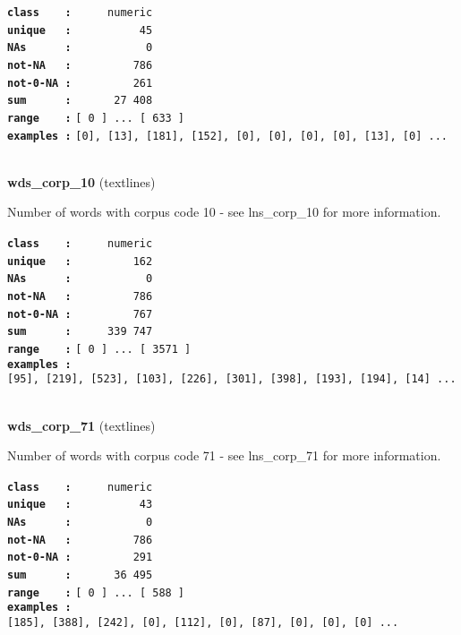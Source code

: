\documentclass[]{article}
\begin{document}
\textbf{\texttt{class\ \ \ \ :}} \texttt{~~~~~numeric}\\
\textbf{\texttt{unique\ \ \ :}} \texttt{~~~~~~~~~~45}\\
\textbf{\texttt{NAs\ \ \ \ \ \ :}} \texttt{~~~~~~~~~~~0}\\
\textbf{\texttt{not-NA\ \ \ :}} \texttt{~~~~~~~~~786}\\
\textbf{\texttt{not-0-NA\ :}} \texttt{~~~~~~~~~261}\\
\textbf{\texttt{sum\ \ \ \ \ \ :}} \texttt{~~~~~~27~408}\\
\textbf{\texttt{range\ \ \ \ :}}
\texttt{{[}\ 0\ {]}\ ...\ {[}\ 633\ {]}}\\
\textbf{\texttt{examples\ :}}
\texttt{{[}0{]},\ {[}13{]},\ {[}181{]},\ {[}152{]},\ {[}0{]},\ {[}0{]},\ {[}0{]},\ {[}0{]},\ {[}13{]},\ {[}0{]}\ ...}\\

~

\textbf{wds\_corp\_10} (textlines)

Number of words with corpus code 10 - see lns\_corp\_10 for more
information.

\textbf{\texttt{class\ \ \ \ :}} \texttt{~~~~~numeric}\\
\textbf{\texttt{unique\ \ \ :}} \texttt{~~~~~~~~~162}\\
\textbf{\texttt{NAs\ \ \ \ \ \ :}} \texttt{~~~~~~~~~~~0}\\
\textbf{\texttt{not-NA\ \ \ :}} \texttt{~~~~~~~~~786}\\
\textbf{\texttt{not-0-NA\ :}} \texttt{~~~~~~~~~767}\\
\textbf{\texttt{sum\ \ \ \ \ \ :}} \texttt{~~~~~339~747}\\
\textbf{\texttt{range\ \ \ \ :}}
\texttt{{[}\ 0\ {]}\ ...\ {[}\ 3571\ {]}}\\
\textbf{\texttt{examples\ :}}
\texttt{{[}95{]},\ {[}219{]},\ {[}523{]},\ {[}103{]},\ {[}226{]},\ {[}301{]},\ {[}398{]},\ {[}193{]},\ {[}194{]},\ {[}14{]}\ ...}\\

~

\textbf{wds\_corp\_71} (textlines)

Number of words with corpus code 71 - see lns\_corp\_71 for more
information.

\textbf{\texttt{class\ \ \ \ :}} \texttt{~~~~~numeric}\\
\textbf{\texttt{unique\ \ \ :}} \texttt{~~~~~~~~~~43}\\
\textbf{\texttt{NAs\ \ \ \ \ \ :}} \texttt{~~~~~~~~~~~0}\\
\textbf{\texttt{not-NA\ \ \ :}} \texttt{~~~~~~~~~786}\\
\textbf{\texttt{not-0-NA\ :}} \texttt{~~~~~~~~~291}\\
\textbf{\texttt{sum\ \ \ \ \ \ :}} \texttt{~~~~~~36~495}\\
\textbf{\texttt{range\ \ \ \ :}}
\texttt{{[}\ 0\ {]}\ ...\ {[}\ 588\ {]}}\\
\textbf{\texttt{examples\ :}}
\texttt{{[}185{]},\ {[}388{]},\ {[}242{]},\ {[}0{]},\ {[}112{]},\ {[}0{]},\ {[}87{]},\ {[}0{]},\ {[}0{]},\ {[}0{]}\ ...}\\
\end{document}
